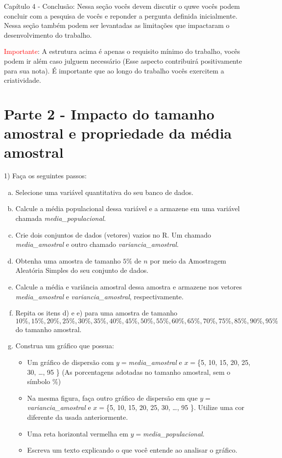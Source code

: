 \documentclass{article}
\begin{document}
Capítulo 4 - Conclusão: Nessa seção vocês devem discutir o quwe vocês podem concluir com a pesquisa de vocês e reponder a pergunta definida inicialmente. Nessa 
seção também podem ser levantadas as limitações que impactaram o desenvolvimento do trabalho. 



\textcolor{red}{Importante}: A estrutura acima é apenas o requisito mínimo do trabalho, vocês podem ir além caso julguem necessário (Esse aspecto contribuirá positivamente para sua nota).
É importante que ao longo do trabalho vocês exercitem a criatividade.


\section{Parte 2 - Impacto do tamanho amostral e propriedade da média amostral}

1) Faça os seguintes passos:
\begin{enumerate}[a)]
    \item Selecione uma variável quantitativa do seu banco de dados. 
    \item Calcule a média populacional dessa variável e a armazene em uma variável chamada \textit{media\_populacional}.
    \item Crie dois conjuntos de dados (vetores) vazios no R. Um chamado \textit{media\_amostral} e outro chamado  \textit{variancia\_amostral}.
    \item Obtenha uma amostra de tamanho $5\%$ de $n$ por meio da Amostragem Aleatória Simples do seu conjunto de dados. 
    \item Calcule a média e variância amostral dessa amostra e armazene nos vetores \textit{media\_amostral} e \textit{variancia\_amostral}, respectivamente.
    \item Repita os itens d) e e) para uma amostra de tamanho $10\%, 15\%, 20\%, 25\%, 30\%, 35\%, 40\%, 45\%, 50\%, 55\%, 60\%, 65\%, 70\%, 75\%, 85\%, 90\%, 95\%$ do 
    tamanho amostral.
    \item Construa um gráfico que possua:
    \begin{itemize}
    \item Um gráfico de dispersão com $y=$\textit{media\_amostral} e $x=$\{5, 10, 15, 20, 25, 30, \dots, 95 \} (As porcentagens adotadas no tamanho amostral, sem o símbolo \%)
    \item Na mesma figura, faça outro gráfico de dispersão em que $y=$\textit{variancia\_amostral} e $x=$\{5, 10, 15, 20, 25, 30, \dots, 95 \}. Utilize uma cor diferente da usada anteriormente. 
    \item Uma reta horizontal vermelha em $y=$\textit{media\_populacional}.
    \item Escreva um texto explicando o que você entende ao analisar o gráfico. 
    \end{itemize} 
\end{enumerate}
\end{document}
